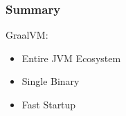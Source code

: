     \begin{frame}[label=lito]
        \frametitle{Summary}
        GraalVM:
        \begin{itemize}
           \item{Entire JVM Ecosystem}
           \item{Single Binary}
           \item{Fast Startup}
        \end{itemize}
    \end{frame}
%
%
%
%
